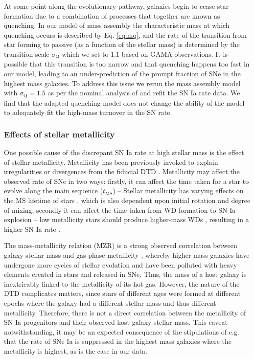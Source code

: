 \documentclass[fleqn,usenatbib]{mnras}
\begin{document}
At some point along the evolutionary pathway, galaxies begin to cease star formation due to a combination of processes that together are known as quenching. In our model of mass assembly the characteristic mass at which quenching occurs is described by Eq. \ref{eq:mq}, and the rate of the transition from star forming to passive (as a function of the stellar mass) is determined by the transition scale $\sigma_{\mathrm{Q}}$ which we set to 1.1 based on GAMA observations. It is possible that this transition is too narrow and that quenching happens too fast in our model, leading to an under-prediction of the prompt fraction of SNe in the highest mass galaxies. To address this issue we rerun the mass assembly model with $\sigma_{\mathrm{Q}} = 1.5$ as per the nominal analysis of \citet{Childress2014} and refit the SN Ia rate data. We find that the adapted quenching model does not change the ability of the model to adequately fit the high-mass turnover in the SN rate.

\subsubsection{Effects of stellar metallicity}

One possible cause of the discrepant SN Ia rate at high stellar mass is the effect of stellar metallicity. Metallicity has been previously invoked to explain irregularities or divergences from the fiducial DTD \citep[e.g.][]{Strolger2010,Meng2011,Kistler2013}. Metallicity may affect the observed rate of SNe in two ways: firstly, it can affect the time taken for a star to evolve along the main sequence ($t_{\mathrm{MS}}$) -- Stellar metallicity has varying effects on the MS lifetime of stars \citep[e.g.][]{Georgy2013,Amard2020}, which is also dependent upon initial rotation and degree of mixing; secondly it can affect the time taken from WD formation to SN Ia explosion -- low metallicity stars should produce higher-mass WDs \citep[e.g.][]{Umeda1999,Marigo2007}, resulting in a higher SN Ia rate \citep{Kistler2013}. 

The mass-metallicity relation (MZR) is a strong observed correlation between galaxy stellar mass and gas-phase metallicity \citep[e.g.][]{Tremonti2004}, whereby higher mass galaxies have undergone more cycles of stellar evolution and have been polluted with heavy elements created in stars and released in SNe. Thus, the mass of a host galaxy is inextricably linked to the metallicity of its hot gas. However, the nature of the DTD complicates matters, since stars of different ages were formed at different epochs where the galaxy had a different stellar mass and thus different metallicity. Therefore, there is not a direct correlation between the metallicity of SN Ia progenitors and their observed host galaxy stellar mass.  This caveat notwithstanding, it may be an expected consequence of the stipulations of e.g. \citet{Kistler2013} that the rate of SNe Ia is suppressed in the highest mass galaxies where the metallicity is highest, as is the case in our data.
\end{document}
